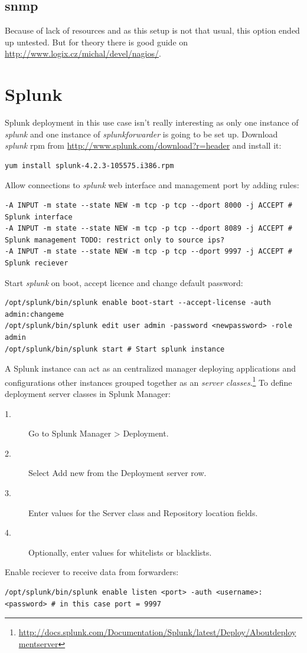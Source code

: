 \documentclass[10pt,a4paper,final]{report}
\begin{document}
\section{snmp}
Because of lack of resources and as this setup is not that usual, this option ended up untested. But for theory there is good guide on \url{http://www.logix.cz/michal/devel/nagios/}.


\chapter{Splunk}
Splunk deployment in this use case isn't really interesting as only one instance of \emph{splunk} and one instance of \emph{splunkforwarder} is going to be set up.
Download \emph{splunk} rpm from \url{http://www.splunk.com/download?r=header} and install it:
\begin{lstlisting}
yum install splunk-4.2.3-105575.i386.rpm
\end{lstlisting}
Allow connections to \emph{splunk} web interface and management port by adding rules:
\begin{lstlisting}
-A INPUT -m state --state NEW -m tcp -p tcp --dport 8000 -j ACCEPT # Splunk interface
-A INPUT -m state --state NEW -m tcp -p tcp --dport 8089 -j ACCEPT # Splunk management TODO: restrict only to source ips?
-A INPUT -m state --state NEW -m tcp -p tcp --dport 9997 -j ACCEPT # Splunk reciever
\end{lstlisting}
Start \emph{splunk} on boot, accept licence and change default password:
\begin{lstlisting}
/opt/splunk/bin/splunk enable boot-start --accept-license -auth admin:changeme
/opt/splunk/bin/splunk edit user admin -password <newpassword> -role admin
/opt/splunk/bin/splunk start # Start splunk instance
\end{lstlisting}
A Splunk instance can act as an centralized manager deploying applications and configurations other instances grouped together as an \emph{server classes}.\footnote{\url{http://docs.splunk.com/Documentation/Splunk/latest/Deploy/Aboutdeploymentserver}} To define deployment server classes in Splunk Manager:
\begin{description}
\item[1.] Go to Splunk Manager > Deployment.
\item[2.] Select Add new from the Deployment server row.
\item[3.] Enter values for the Server class and Repository location fields.
\item[4.] Optionally, enter values for whitelists or blacklists. 
\end{description}
Enable reciever to receive data from forwarders:
\begin{lstlisting}
/opt/splunk/bin/splunk enable listen <port> -auth <username>:<password> # in this case port = 9997
\end{lstlisting}
\end{document}
